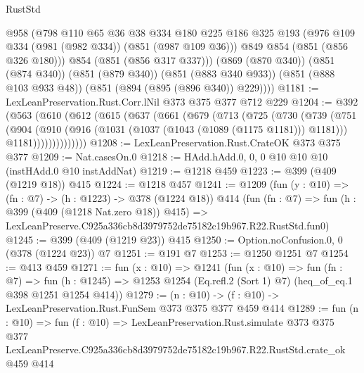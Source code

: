 \begin{lexlean}{RustStd}
\begin{coremodule}
          @958
          (@798
            @110
            @65
            @36
            @38
            @334
            @180
            @225
            @186
            @325
            @193
            (@976 @109 @334 (@981 (@982 @334)) (@851 (@987 @109 @36)))
            @849
            @854
            (@851 (@856 @326 @180)))
          @854
          (@851 (@856 @317 @337)))
        (@869 (@870 @340))
        (@851 (@874 @340))
        (@851 (@879 @340))
        (@851 (@883 @340 @933))
        (@851 (@888 @103 @933 @48))
        (@851 (@894 (@895 (@896 @340)) @229))))
@1181 := LexLeanPreservation.Rust.Corr.lNil @373 @375 @377 @712 @229
@1204 := @392
    (@563
      (@610
        (@612
          (@615
            (@637
              (@661
                (@679
                  (@713
                    (@725
                      (@730
                        (@739
                          (@751
                            (@904
                              (@910
                                (@916 (@1031 (@1037 (@1043 (@1089 (@1175 @1181))) @1181)))
                                @1181))))))))))))))
@1208 := LexLeanPreservation.Rust.CrateOK @373 @375 @377
@1209 := Nat.casesOn.{0}
@1218 := HAdd.hAdd.{0, 0, 0} @10 @10 @10 (instHAdd.{0} @10 instAddNat)
@1219 := @1218 @459
@1223 := @399 (@409 (@1219 @18)) @415
@1224 := @1218 @457
@1241 := @1209
    (fun (y : @10) => (fn : @7) -> (h : @1223) -> @378 (@1224 @18))
    @414
    (fun (fn : @7) =>
    fun (h : @399 (@409 (@1218 Nat.zero @18)) @415) =>
    LexLeanPreserve.C925a336cb8d3979752de75182c19b967.R22.RustStd.fun0)
@1245 := @399 (@409 (@1219 @23)) @415
@1250 := Option.noConfusion.{0, 0} (@378 (@1224 @23)) @7
@1251 := @191 @7
@1253 := @1250 @1251 @7
@1254 := @413 @459
@1271 := fun (x : @10) =>
  @1241
    (fun (x : @10) =>
    fun (fn : @7) =>
    fun (h : @1245) => @1253 @1254 (Eq.refl.{2} (Sort 1) @7) (heq_of_eq.{1} @398 @1251 @1254 @414))
@1279 := (n : @10) -> (f : @10) -> LexLeanPreservation.Rust.FunSem @373 @375 @377 @459 @414
@1289 := fun (n : @10) =>
  fun (f : @10) =>
  LexLeanPreservation.Rust.simulate
    @373
    @375
    @377
    LexLeanPreserve.C925a336cb8d3979752de75182c19b967.R22.RustStd.crate_ok
    @459
    @414
\end{coremodule}
\end{lexlean}
